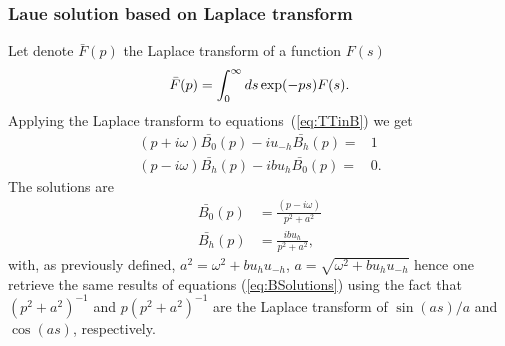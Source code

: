 \documentclass{iucr}
\begin{document}
\subsubsection{Laue solution based on Laplace transform}
\label{sec:laplaceLaue}
Let denote $\bar{F}(p)$ the Laplace transform of a function $F(s)$
\begin{equation}
\Bar{F}(p) = \int_0^\infty ds \exp(-p s) F(s). \nonumber
\end{equation}
Applying the Laplace transform to equations~(\ref{eq:TTinB}) we get
\begin{subequations}
\label{eq:TTlaueLaplace}
\begin{align}
(p + i \omega) \bar{B_0}(p) - i u_{-h} \bar{B_h}(p)= & 1 \nonumber \\
(p - i \omega) \bar{B_h}(p) - i b u_{h} \bar{B_0}(p)= & 0. \nonumber
\end{align}
\end{subequations}
The solutions are
\begin{subequations}
\begin{align}
\bar{B_0}(p) &= \frac{(p - i \omega) }{p^2 + a^2} \nonumber \\
\bar{B_h}(p) &= \frac{i b u_h}{p^2 + a^2}, \nonumber
\end{align}
\end{subequations}
with, as previously defined, $a^2=\omega^2 + b u_h u_{-h}$, $a=\sqrt{\omega^2+b u_h u_{-h}}$
hence one retrieve the same results of equations (\ref{eq:BSolutions}) using the fact that  $(p^2+a^2)^{-1}$ and $p(p^2+a^2)^{-1}$ are the Laplace transform of $\sin(a s)/a$ and $\cos(a s)$, respectively. 
\end{document}
